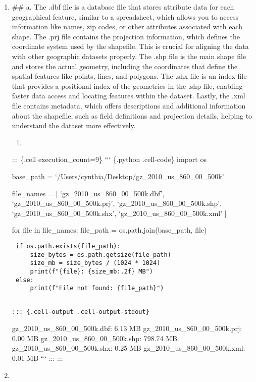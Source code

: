\documentclass[
  letterpaper,
  DIV=11,
  numbers=noendperiod]{scrartcl}
\providecommand{\tightlist}{%
  \setlength{\itemsep}{0pt}\setlength{\parskip}{0pt}}\usepackage{longtable,booktabs,array}
\begin{document}
\begin{enumerate}
\def\labelenumi{\arabic{enumi}.}
\item
  \#\# a. The .dbf file is a database file that stores attribute data
  for each geographical feature, similar to a spreadsheet, which allows
  you to access information like names, zip codes, or other attributes
  associated with each shape. The .prj file contains the projection
  information, which defines the coordinate system used by the
  shapefile. This is crucial for aligning the data with other geographic
  datasets properly. The .shp file is the main shape file and stores the
  actual geometry, including the coordinates that define the spatial
  features like points, lines, and polygons. The .shx file is an index
  file that provides a positional index of the geometries in the .shp
  file, enabling faster data access and locating features within the
  dataset. Lastly, the .xml file contains metadata, which offers
  descriptions and additional information about the shapefile, such as
  field definitions and projection details, helping to understand the
  dataset more effectively.

  \begin{enumerate}
  \def\labelenumii{\alph{enumii}.}
  \setcounter{enumii}{1}
  \tightlist
  \item
  \end{enumerate}

  ::: \{.cell execution\_count=9\} ``` \{.python .cell-code\} import os

  base\_path = `/Users/cynthia/Desktop/gz\_2010\_us\_860\_00\_500k'

  file\_names = {[} `gz\_2010\_us\_860\_00\_500k.dbf',
  `gz\_2010\_us\_860\_00\_500k.prj', `gz\_2010\_us\_860\_00\_500k.shp',
  `gz\_2010\_us\_860\_00\_500k.shx', `gz\_2010\_us\_860\_00\_500k.xml'
  {]}

  for file in file\_names: file\_path = os.path.join(base\_path, file)

\begin{verbatim}
 if os.path.exists(file_path): 
     size_bytes = os.path.getsize(file_path)
     size_mb = size_bytes / (1024 * 1024)
     print(f"{file}: {size_mb:.2f} MB")
 else:
     print(f"File not found: {file_path}")
\end{verbatim}

\begin{verbatim}

::: {.cell-output .cell-output-stdout}
\end{verbatim}

  gz\_2010\_us\_860\_00\_500k.dbf: 6.13 MB
  gz\_2010\_us\_860\_00\_500k.prj: 0.00 MB
  gz\_2010\_us\_860\_00\_500k.shp: 798.74 MB
  gz\_2010\_us\_860\_00\_500k.shx: 0.25 MB
  gz\_2010\_us\_860\_00\_500k.xml: 0.01 MB ``` ::: :::
\item
\end{enumerate}
\end{document}
